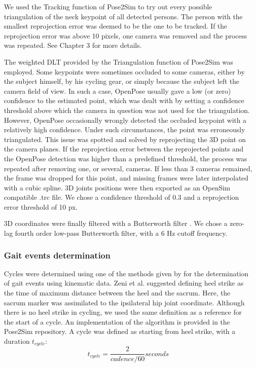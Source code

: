 We used the Tracking function of Pose2Sim to try out every possible triangulation of the neck keypoint of all detected persons. The person with the smallest reprojection error was deemed to be the one to be tracked. If the reprojection error was above 10 pixels, one camera was removed and the process was repeated. See  Chapter 3 for more details.

The weighted DLT provided by the Triangulation function of Pose2Sim was employed. Some keypoints were sometimes occluded to some cameras, either by the subject himself, by his cycling gear, or simply because the subject left the camera field of view. In such a case, OpenPose usually gave a low (or zero) confidence to the estimated point, which was dealt with by setting a confidence threshold above which the camera in question was not used for the triangulation. However, OpenPose occasionally wrongly detected the occluded keypoint with a relatively high confidence. Under such circumstances, the point was erroneously triangulated. This issue was spotted and solved by reprojecting the 3D point on the camera planes. If the reprojection error between the reprojected points and the OpenPose detection was higher than a predefined threshold, the process was repeated after removing one, or several, cameras. If less than 3 cameras remained, the frame was dropped for this point, and missing frames were later interpolated with a cubic spline. 3D joints positions were then exported as an OpenSim compatible .trc file.
We chose a confidence threshold of 0.3 and a reprojection error threshold of 10 px.

3D coordinates were finally filtered with a Butterworth filter \cite{Butterworth1930}. We chose a zero-lag fourth order low-pass Butterworth filter, with a 6 Hz cutoff frequency.

\subsubsection{Gait events determination}

Cycles were determined using one of the methods given by \cite{Zeni2008} for the determination of gait events using kinematic data. Zeni et al. suggested defining heel strike as the time of maximum distance between the heel and the sacrum. Here, the sacrum marker was assimilated to the ipsilateral hip joint coordinate. Although there is no heel strike in cycling, we used the same definition as a reference for the start of a cycle. An implementation of the algorithm is provided in the Pose2Sim repository. A cycle was defined as starting from heel strike, with a duration \(t_{cycle}\):
\begin{equation}
      t_{cycle} = \frac{2}{cadence/60}seconds
\end{equation}

